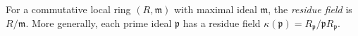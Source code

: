 
For a commutative local ring $(R,\mathfrak m)$ with maximal ideal $\mathfrak m$, the \emph{residue field} is $R/\mathfrak m$. More generally, each prime ideal $\mathfrak p$ has a residue field $\kappa(\mathfrak p)=R_{\mathfrak p}/\mathfrak pR_{\mathfrak p}$.

